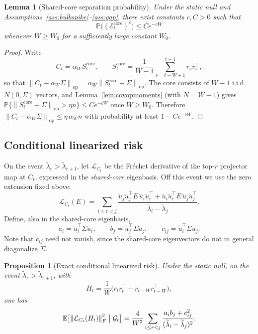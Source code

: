 \documentclass[11pt]{article}
\theoremstyle{tightplain}
\newtheorem{proposition}[theorem]{Proposition}
\newtheorem{lemma}[theorem]{Lemma}
\theoremstyle{tightdef}
\DeclareMathOperator{\op}{op}
\newcommand{\E}{\mathbb E}
\newcommand{\Prob}{\mathbb P}
\newcommand{\norm}[1]{\left\lVert #1 \right\rVert}
\begin{document}
\begin{lemma}[Shared-core separation probability]\label{lem:sharedcoreevent}
Under the static null and Assumptions~\ref{ass:bulkspike}--\ref{ass:gap}, there
exist constants $c,C>0$ such that
\[
\Prob\bigl((\mathcal E_t^{\mathrm{core}})^c\bigr)\le Ce^{-cW}
\]
whenever $W\ge W_0$ for a sufficiently large constant $W_0$.
\end{lemma}

\begin{proof}
Write
\[
C_t=\alpha_W S_t^{\mathrm{core}},
\qquad
S_t^{\mathrm{core}}=\frac1{W-1}\sum_{s=t-W+1}^{t-1}r_s r_s^\top,
\]
so that
$\norm{C_t-\alpha_W\Sigma}_{\op}=\alpha_W\norm{S_t^{\mathrm{core}}-\Sigma}_{\op}$.
The core consists of $W-1$ i.i.d.\ $N(0,\Sigma)$ vectors, and
Lemma~\ref{lem:covopmoments} (with $N=W-1$) gives
$\Prob\{\norm{S_t^{\mathrm{core}}-\Sigma}_{\op}>\eta n\}\le Ce^{-cW}$ once
$W\ge W_0$. Therefore
$\norm{C_t-\alpha_W\Sigma}_{\op}\le\eta\,\alpha_W n$ with probability at least
$1-Ce^{-cW}$.
\end{proof}

\subsection{Conditional linearized risk}

On the event $\widetilde\lambda_r>\widetilde\lambda_{r+1}$, let
$\mathcal L_{C_t}$ be the Fr\'echet derivative of the top-$r$ projector map at
$C_t$, expressed in the \emph{shared-core} eigenbasis. Off this event we use the
zero extension fixed above:
\[
\mathcal L_{C_t}(E)
=\sum_{i\le r<j}
\frac{
\widetilde u_j\widetilde u_j^\top E\,\widetilde u_i\widetilde u_i^\top
+
\widetilde u_i\widetilde u_i^\top E\,\widetilde u_j\widetilde u_j^\top
}
{\widetilde\lambda_i-\widetilde\lambda_j}.
\]
Define, also in the shared-core eigenbasis,
\[
a_i=\widetilde u_i^\top\Sigma\widetilde u_i,
\qquad
b_j=\widetilde u_j^\top\Sigma\widetilde u_j,
\qquad
c_{ij}=\widetilde u_i^\top\Sigma\widetilde u_j.
\]
Note that $c_{ij}$ need not vanish, since the shared-core eigenvectors do not in
general diagonalize $\Sigma$.

\begin{proposition}[Exact conditional linearized risk]\label{prop:conditionallinearized}
Under the static null, on the event
$\widetilde\lambda_r>\widetilde\lambda_{r+1}$, with
\[
H_t=\frac1W\bigl(r_t r_t^\top-r_{t-W}r_{t-W}^\top\bigr),
\]
one has
\[
\E\bigl[\norm{\mathcal L_{C_t}(H_t)}_F^2\bigm|\mathcal G_t\bigr]
=\frac4{W^2}
\sum_{i\le r<j}
\frac{a_i b_j+c_{ij}^2}{(\widetilde\lambda_i-\widetilde\lambda_j)^2}.
\]
\end{proposition}
\end{document}
